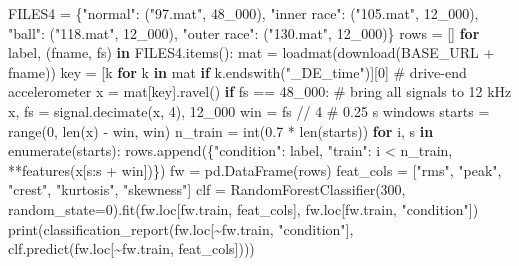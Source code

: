 \documentclass[
  letterpaper,
  DIV=11,
  numbers=noendperiod]{scrreprt}
\newenvironment{Shaded}{\begin{snugshade}}{\end{snugshade}}
\newcommand{\BuiltInTok}[1]{\textcolor[rgb]{0.00,0.23,0.31}{#1}}
\newcommand{\CommentTok}[1]{\textcolor[rgb]{0.37,0.37,0.37}{#1}}
\newcommand{\ControlFlowTok}[1]{\textcolor[rgb]{0.00,0.23,0.31}{\textbf{#1}}}
\newcommand{\DecValTok}[1]{\textcolor[rgb]{0.68,0.00,0.00}{#1}}
\newcommand{\FloatTok}[1]{\textcolor[rgb]{0.68,0.00,0.00}{#1}}
\newcommand{\KeywordTok}[1]{\textcolor[rgb]{0.00,0.23,0.31}{\textbf{#1}}}
\newcommand{\NormalTok}[1]{\textcolor[rgb]{0.00,0.23,0.31}{#1}}
\newcommand{\OperatorTok}[1]{\textcolor[rgb]{0.37,0.37,0.37}{#1}}
\newcommand{\StringTok}[1]{\textcolor[rgb]{0.13,0.47,0.30}{#1}}
\begin{document}
\begin{tcolorbox}
\begin{Shaded}
\begin{Highlighting}[]
\NormalTok{FILES4 }\OperatorTok{=}\NormalTok{ \{}\StringTok{"normal"}\NormalTok{: (}\StringTok{"97.mat"}\NormalTok{, }\DecValTok{48\_000}\NormalTok{), }\StringTok{"inner race"}\NormalTok{: (}\StringTok{"105.mat"}\NormalTok{, }\DecValTok{12\_000}\NormalTok{),}
          \StringTok{"ball"}\NormalTok{: (}\StringTok{"118.mat"}\NormalTok{, }\DecValTok{12\_000}\NormalTok{), }\StringTok{"outer race"}\NormalTok{: (}\StringTok{"130.mat"}\NormalTok{, }\DecValTok{12\_000}\NormalTok{)\}}
\NormalTok{rows }\OperatorTok{=}\NormalTok{ []}
\ControlFlowTok{for}\NormalTok{ label, (fname, fs) }\KeywordTok{in}\NormalTok{ FILES4.items():}
\NormalTok{    mat }\OperatorTok{=}\NormalTok{ loadmat(download(BASE\_URL }\OperatorTok{+}\NormalTok{ fname))}
\NormalTok{    key }\OperatorTok{=}\NormalTok{ [k }\ControlFlowTok{for}\NormalTok{ k }\KeywordTok{in}\NormalTok{ mat }\ControlFlowTok{if}\NormalTok{ k.endswith(}\StringTok{"\_DE\_time"}\NormalTok{)][}\DecValTok{0}\NormalTok{]   }\CommentTok{\# drive{-}end accelerometer}
\NormalTok{    x }\OperatorTok{=}\NormalTok{ mat[key].ravel()}
    \ControlFlowTok{if}\NormalTok{ fs }\OperatorTok{==} \DecValTok{48\_000}\NormalTok{:                                   }\CommentTok{\# bring all signals to 12 kHz}
\NormalTok{        x, fs }\OperatorTok{=}\NormalTok{ signal.decimate(x, }\DecValTok{4}\NormalTok{), }\DecValTok{12\_000}
\NormalTok{    win }\OperatorTok{=}\NormalTok{ fs }\OperatorTok{//} \DecValTok{4}                                      \CommentTok{\# 0.25 s windows}
\NormalTok{    starts }\OperatorTok{=} \BuiltInTok{range}\NormalTok{(}\DecValTok{0}\NormalTok{, }\BuiltInTok{len}\NormalTok{(x) }\OperatorTok{{-}}\NormalTok{ win, win)}
\NormalTok{    n\_train }\OperatorTok{=} \BuiltInTok{int}\NormalTok{(}\FloatTok{0.7} \OperatorTok{*} \BuiltInTok{len}\NormalTok{(starts))}
    \ControlFlowTok{for}\NormalTok{ i, s }\KeywordTok{in} \BuiltInTok{enumerate}\NormalTok{(starts):}
\NormalTok{        rows.append(\{}\StringTok{"condition"}\NormalTok{: label, }\StringTok{"train"}\NormalTok{: i }\OperatorTok{\textless{}}\NormalTok{ n\_train, }\OperatorTok{**}\NormalTok{features(x[s:s }\OperatorTok{+}\NormalTok{ win])\})}
\NormalTok{fw }\OperatorTok{=}\NormalTok{ pd.DataFrame(rows)}
\NormalTok{feat\_cols }\OperatorTok{=}\NormalTok{ [}\StringTok{"rms"}\NormalTok{, }\StringTok{"peak"}\NormalTok{, }\StringTok{"crest"}\NormalTok{, }\StringTok{"kurtosis"}\NormalTok{, }\StringTok{"skewness"}\NormalTok{]}
\NormalTok{clf }\OperatorTok{=}\NormalTok{ RandomForestClassifier(}\DecValTok{300}\NormalTok{, random\_state}\OperatorTok{=}\DecValTok{0}\NormalTok{).fit(fw.loc[fw.train, feat\_cols], fw.loc[fw.train, }\StringTok{"condition"}\NormalTok{])}
\BuiltInTok{print}\NormalTok{(classification\_report(fw.loc[}\OperatorTok{\textasciitilde{}}\NormalTok{fw.train, }\StringTok{"condition"}\NormalTok{], clf.predict(fw.loc[}\OperatorTok{\textasciitilde{}}\NormalTok{fw.train, feat\_cols])))}
\end{Highlighting}
\end{Shaded}


\end{tcolorbox}
\end{document}
